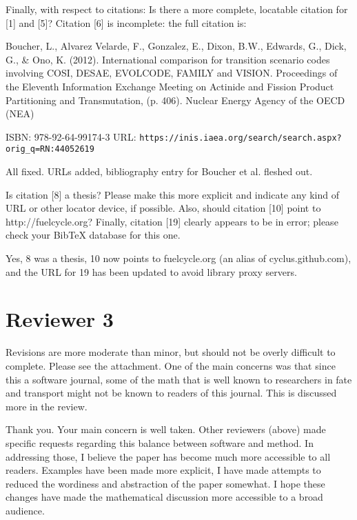 \documentclass[answers,12pt]{exam}
\begin{document}
\begin{questions}
\question Finally, with respect to citations: 
Is there a more complete, locatable citation for [1] and [5]? Citation [6] is incomplete: the full citation is:

Boucher, L., Alvarez Velarde, F., Gonzalez, E., Dixon, B.W., Edwards, G., Dick, 
G., \& Ono, K. (2012). International comparison for transition scenario codes involving COSI, DESAE, EVOLCODE, FAMILY and VISION. Proceedings of the Eleventh Information Exchange Meeting on Actinide and Fission Product Partitioning and Transmutation, (p. 406). Nuclear Energy Agency of the OECD (NEA)

ISBN: 978-92-64-99174-3
URL: \verb|https://inis.iaea.org/search/search.aspx?orig_q=RN:44052619|
\begin{solution}
All fixed. URLs added, bibliography entry for Boucher et al. fleshed out.
\end{solution}

\question Is citation [8] a thesis? Please make this more explicit and indicate any kind of URL or other locator device, if possible. Also, should citation [10] point to http://fuelcycle.org? Finally, citation [19] clearly appears to be in error; please check your BibTeX database for this one.
\begin{solution}
        Yes, 8 was a thesis, 10 now points to fuelcycle.org (an alias of 
        cyclus.github.com), and the URL for 19 has been updated to avoid 
        library proxy servers.
\end{solution}

\section*{Reviewer 3}

\question   Revisions are more moderate than minor, but should not be overly difficult
to complete. Please see the attachment. One of the main concerns was that since
this a software journal, some of the math that is well known to researchers in
fate and transport might not be known to readers of this journal. This is
discussed more in the review.
\begin{solution}
Thank you. Your main concern is well taken. Other reviewers (above) made 
        specific requests regarding this balance between software and method. 
        In addressing those, I believe the paper has become much more 
        accessible to all readers. Examples have been made more explicit, I 
        have made attempts to reduced the wordiness and abstraction of the 
        paper somewhat. I hope these changes have made the mathematical 
        discussion more accessible to a broad audience. 
\end{solution}


\end{questions}
\end{document}
